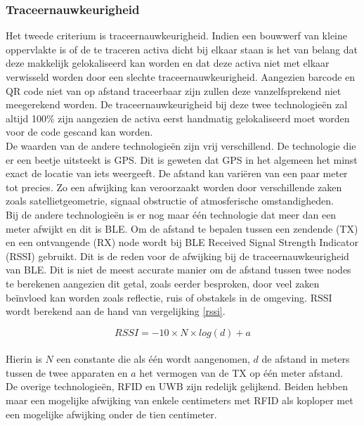 \subsubsection{Traceernauwkeurigheid}
Het tweede criterium is traceernauwkeurigheid. Indien een bouwwerf van kleine oppervlakte is of de te traceren activa dicht bij elkaar staan is het van belang dat deze makkelijk gelokaliseerd kan worden en dat deze activa niet met elkaar verwisseld worden door een slechte traceernauwkeurigheid. Aangezien barcode en QR code niet van op afstand traceerbaar zijn zullen deze vanzelfsprekend niet meegerekend worden. De traceernauwkeurigheid bij deze twee technologieën zal altijd 100\% zijn aangezien de activa eerst handmatig gelokaliseerd moet worden voor de code gescand kan worden.\\

De waarden van de andere technologieën zijn vrij verschillend. De technologie die er een beetje uitsteekt is GPS. Dit is geweten dat GPS in het algemeen het minst exact de locatie van iets weergeeft. De afstand kan variëren van een paar meter tot precies. Zo een afwijking kan veroorzaakt worden door verschillende zaken zoals satellietgeometrie, signaal obstructie of atmosferische omstandigheden.\\

Bij de andere technologieën is er nog maar één technologie dat meer dan een meter afwijkt en dit is BLE. Om de afstand te bepalen tussen een zendende (TX) en een ontvangende (RX) node wordt bij BLE Received Signal Strength Indicator (RSSI) gebruikt. Dit is de reden voor de afwijking bij de traceernauwkeurigheid van BLE. Dit is niet de meest accurate manier om de afstand tussen twee nodes te berekenen aangezien dit getal, zoals eerder besproken, door veel zaken beïnvloed kan worden zoals reflectie, ruis of obstakels in de omgeving. RSSI wordt berekend aan de hand van vergelijking \ref{rssi}.

\begin{equation}
    \label{rssi}
    RSSI=−10×N×log(d)+a
\end{equation}\\

Hierin is $N$ een constante die als één wordt aangenomen, $d$ de afstand in meters tussen de twee apparaten en $a$ het vermogen van de TX op één meter afstand.\\

De overige technologieën, RFID en UWB zijn redelijk gelijkend. Beiden hebben maar een mogelijke afwijking van enkele centimeters met RFID als koploper met een mogelijke afwijking onder de tien centimeter.\\

